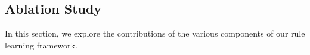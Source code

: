 
\subsection{Ablation Study}
In this section, we explore the contributions of the various components of our rule learning framework.
